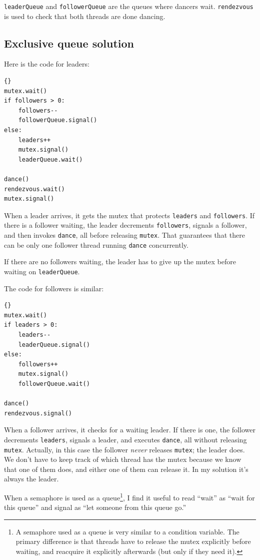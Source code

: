 \documentclass{book}
\begin{document}
    {\tt leaderQueue} and {\tt followerQueue} are the queues where
dancers wait.  {\tt rendezvous} is used to check that both threads
are done dancing.




\subsection {Exclusive queue solution}

Here is the code for leaders:

\begin{lstlisting}[title={Queue solution (leaders)}]{}
mutex.wait()
if followers > 0:
    followers--
    followerQueue.signal()
else:
    leaders++
    mutex.signal()
    leaderQueue.wait()    

dance()
rendezvous.wait()
mutex.signal()
\end{lstlisting}

When a leader arrives, it gets the mutex that protects {\tt leaders}
and {\tt followers}.  If there is a follower waiting, the leader
decrements {\tt followers}, signals a follower, and then invokes
    {\tt dance}, all before releasing {\tt mutex}.  That guarantees that
there can be only one follower thread running {\tt dance}
concurrently.

If there are no followers waiting, the leader has to give up the mutex
before waiting on {\tt leaderQueue}.

The code for followers is similar:

\newpage
\begin{lstlisting}[title={Queue solution (followers)}]{}
mutex.wait()
if leaders > 0:
    leaders--
    leaderQueue.signal()
else:
    followers++
    mutex.signal()
    followerQueue.wait()    

dance()
rendezvous.signal()
\end{lstlisting}

When a follower arrives, it checks for a waiting leader.  If there
is one, the follower decrements {\tt leaders}, signals a leader, and
executes {\tt dance}, all without releasing {\tt mutex}.  Actually,
in this case the follower {\em never} releases {\tt mutex};
the leader does.  We don't have to keep track of which thread has the
mutex because we know that one of them does, and either one of them can
release it.  In my solution it's always the leader.

When a semaphore is used as a queue\footnote{A semaphore used as a
    queue is very similar to a condition variable.  The primary difference
    is that threads have to release the mutex explicitly before waiting,
    and reacquire it explicitly afterwards (but only if they need it).},
I find it useful to read ``wait'' as ``wait for this queue'' and
signal as ``let someone from this queue go.''
\end{document}
